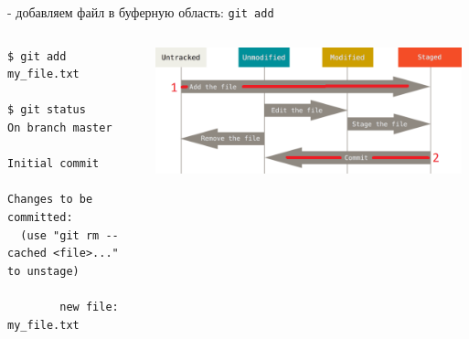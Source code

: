 \documentclass[presentation]{beamer}
\begin{document}
\begin{frame}[fragile,label={sec:org255e6e8}]{- добавляем файл в буферную область:}
 \alert{\texttt{git add}}

\begin{columns}
\begin{column}{0.65\columnwidth}
\begin{verbatim}
$ git add my_file.txt

$ git status
On branch master

Initial commit

Changes to be committed:
  (use "git rm --cached <file>..." to unstage)

        new file:   my_file.txt
\end{verbatim}
\end{column}

\begin{column}{0.35\columnwidth}
\begin{center}
\includegraphics[width=0.98\textwidth]{./01_vcs_01_git_file_states_01_add.png}
\end{center}
\end{column}
\end{columns}
\end{frame}
\end{document}
